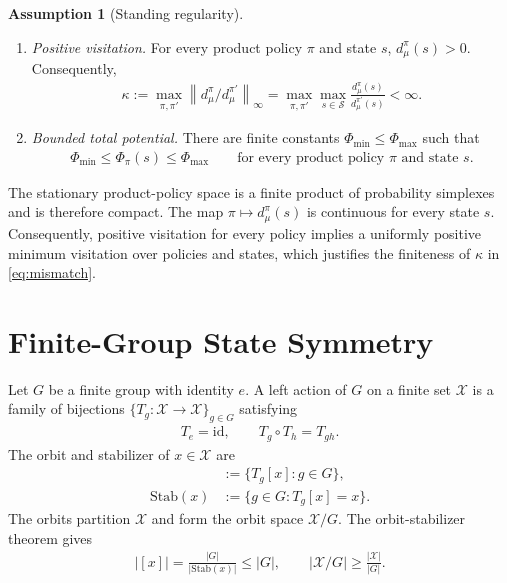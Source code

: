 \documentclass{article}
\theoremstyle{plain}
\theoremstyle{definition}
\newtheorem{assumption}[theorem]{Assumption}
\theoremstyle{remark}
\newcommand{\St}{\mathcal{S}}
\newcommand{\abs}[1]{\left\lvert#1\right\rvert}
\newcommand{\norm}[1]{\left\lVert#1\right\rVert}
\newcommand{\orbit}[1]{[#1]}
\begin{document}
\begin{assumption}[Standing regularity]
\label{assumption:standing}
\leavevmode
\begin{enumerate}[label=(\roman*),leftmargin=2.2em,itemsep=2pt,topsep=2pt]
  \item \emph{Positive visitation.}
  For every product policy $\pi$ and state $s$,
  $d^\pi_\mu(s)>0$. Consequently,
  \begin{align}
    \kappa
    :=
    \max_{\pi,\pi'}
    \norm{d^\pi_\mu/d^{\pi'}_\mu}_\infty
    =
    \max_{\pi,\pi'}\max_{s\in\St}
    \frac{d^\pi_\mu(s)}{d^{\pi'}_\mu(s)}
    <\infty.
    \label{eq:mismatch}
  \end{align}
  \item \emph{Bounded total potential.}
  There are finite constants $\Phi_{\min}\le\Phi_{\max}$ such that
  \begin{align*}
    \Phi_{\min}\le\Phi_\pi(s)\le\Phi_{\max}
    \qquad
    \text{for every product policy $\pi$ and state $s$.}
  \end{align*}
\end{enumerate}
\end{assumption}

The stationary product-policy space is a finite product of probability simplexes
and is therefore compact. The map $\pi\mapsto d^\pi_\mu(s)$ is continuous for
every state $s$. Consequently, positive visitation for every policy implies a
uniformly positive minimum visitation over policies and states, which justifies
the finiteness of $\kappa$ in \eqref{eq:mismatch}.

\section{Finite-Group State Symmetry}
\label{sec:state-symmetry}

Let $G$ be a finite group with identity $e$. A left action of $G$ on a finite set
$\mathcal X$ is a family of bijections $\{T_g:\mathcal X\to\mathcal X\}_{g\in G}$
satisfying
\begin{align*}
  T_e=\mathrm{id},
  \qquad
  T_g\circ T_h=T_{gh}.
\end{align*}
The orbit and stabilizer of $x\in\mathcal X$ are
\begin{align*}
  \orbit{x}
  &:=
  \{T_g[x]:g\in G\},\\
  \mathrm{Stab}(x)
  &:=
  \{g\in G:T_g[x]=x\}.
\end{align*}
The orbits partition $\mathcal X$ and form the orbit space $\mathcal X/G$.
The orbit-stabilizer theorem gives
\begin{align*}
  \abs{\orbit{x}}
  =
  \frac{\abs G}{\abs{\mathrm{Stab}(x)}}
  \le\abs G,
  \qquad
  \abs{\mathcal X/G}\ge\frac{\abs{\mathcal X}}{\abs G}.
\end{align*}
\end{document}
